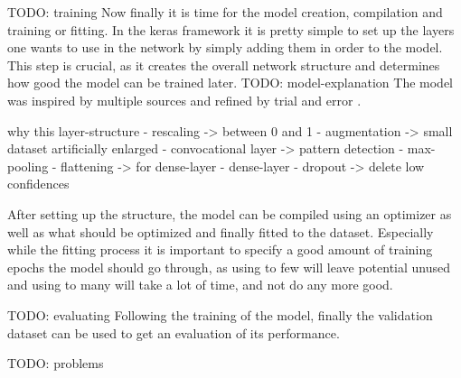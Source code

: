

TODO: training
Now finally it is time for the model creation, compilation and training or
fitting. In the keras framework it is pretty simple to set up the layers one
wants to use in the network by simply adding them in order to the model. This
step is crucial, as it creates the overall network structure and determines how
good the model can be trained later. 
TODO: model-explanation
The model was inspired by multiple sources and refined by trial and error \cite{Prakash2020}. 


why this layer-structure 
- rescaling -> between 0 and 1
- augmentation -> small dataset artificially enlarged
- convocational layer -> pattern detection
- max-pooling
- flattening -> for dense-layer
- dense-layer
- dropout -> delete low confidences

After setting up the structure, the model can be compiled using an optimizer as
well as what should be optimized and finally fitted to the dataset. Especially
while the fitting process it is important to specify a good amount of training
epochs the model should go through, as using to few will leave potential unused
and using to many will take a lot of time, and not do any more good.



TODO: evaluating
Following the training of the model, finally the validation dataset can be used to get an
evaluation of its performance. 


TODO: problems


